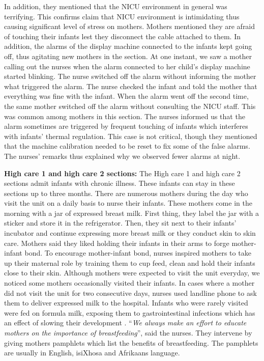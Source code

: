 In addition, they mentioned that the NICU environment in general was terrifying. This confirms \textcite{Obeidat2009} claim that NICU environment is intimidating thus causing significant level of stress on mothers. Mothers mentioned they are afraid of touching their infants lest they disconnect the cable attached to them. In addition, the alarms of the display machine connected to the infants kept going off, thus agitating new mothers in the section. At one instant, we saw a mother calling out the nurses when the alarm connected to her child's display machine started blinking. The nurse switched off the alarm without informing the mother what triggered the alarm. The nurse checked the infant and told the mother that everything was fine with the infant. When the alarm went off the second time, the same mother switched off the alarm without consulting the NICU staff. This was common among mothers in this section. The nurses informed us that the alarm sometimes are triggered by frequent touching of infants which interferes with infants' thermal regulation. This case is not critical, though they mentioned that the machine calibration needed to be reset to fix some of the false alarms. The nurses' remarks thus explained why we observed fewer alarms at night.

 \textbf{High care 1 and high care 2 sections:} The High care 1 and high care 2 sections admit infants with chronic illness. These infants can stay in these sections up to three months. There are numerous mothers during the day who visit the unit on a daily basis to nurse their infants. These mothers come in the morning with a jar of expressed breast milk. First thing, they label the jar with a sticker and store it in the refrigerator. Then, they sit next to their infants’ incubator and continue expressing more breast milk or they conduct skin to skin care. Mothers said they liked holding their infants in their arms to forge mother-infant bond. To encourage mother-infant bond, nurses inspired mothers to take up their maternal role by training them to cup feed, clean and hold their infants close to their skin. Although mothers were expected to visit the unit everyday, we noticed some mothers occasionally visited their infants. In cases where a mother did not visit the unit for two consecutive days, nurses used landline phone to ask them to deliver expressed milk to the hospital. Infants who were rarely visited were fed on formula milk, exposing them to gastrointestinal infections which has an effect of slowing their development \citep{Embleton2001}. \enquote{\itshape We always make an effort to educate mothers on the importance of breastfeeding}, said the nurses. They intervene by giving mothers pamphlets which list the benefits of breastfeeding. The pamphlets are usually in English, isiXhosa and Afrikaans language.

